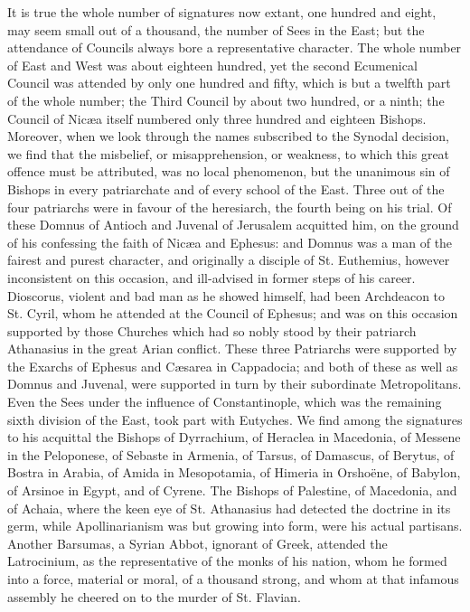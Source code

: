It is true the whole number of signatures now extant, one hundred
and eight, may seem small out of a thousand, the number of Sees in the
East; but the attendance of Councils always bore a representative
character. The whole number of East and West was about eighteen
hundred, yet the second Ecumenical Council was attended by only one
hundred and fifty, which is but a twelfth part of the whole number;
the Third Council by about two hundred, or a ninth; the Council of
Nicæa itself numbered only three hundred and eighteen Bishops.
Moreover, when we look through the names subscribed to the Synodal
decision, we find that the misbelief, or misapprehension, or weakness,
to which this great offence must be attributed, was no local
phenomenon, but the unanimous sin of Bishops in every patriarchate and
of every school of the East. Three out of the four patriarchs were in
favour of the heresiarch, the fourth being on his trial. Of these
Domnus of Antioch and Juvenal of Jerusalem acquitted him, on the
ground of his confessing the faith of Nicæa and Ephesus: and Domnus
was a man of the fairest and purest character, and originally a
disciple of St. Euthemius, however inconsistent on this occasion, and
ill-advised in former steps of his career. Dioscorus, violent and bad
man as he showed himself, had been Archdeacon to St. Cyril, whom he
attended at the Council of Ephesus; and was on this occasion supported
by those Churches which had so nobly stood by their patriarch
Athanasius in the great Arian conflict. These three Patriarchs were
supported by the Exarchs of Ephesus and Cæsarea in Cappadocia; and
both of these as well as Domnus and Juvenal, were supported in turn by
their subordinate Metropolitans. Even the Sees under the influence of
Constantinople, which was the remaining sixth division of the East,
took part with Eutyches. We find among the signatures to his acquittal
the Bishops of Dyrrachium, of Heraclea in Macedonia, of Messene in the
Peloponese, of Sebaste in Armenia, of Tarsus, of Damascus, of Berytus,
of Bostra in Arabia, of Amida in Mesopotamia, of Himeria in Orshoëne,
of Babylon, of Arsinoe in Egypt, and of Cyrene. The Bishops of
Palestine, of Macedonia, and of Achaia, where the keen eye of St.
Athanasius had detected the doctrine in its germ, while
Apollinarianism was but growing into form, were his actual partisans.
Another Barsumas, a Syrian Abbot, ignorant of Greek, attended the
Latrocinium, as the representative of the monks of his nation, whom he
formed into a force, material or moral, of a thousand strong, and whom
at that infamous assembly he cheered on to the murder of St. Flavian.

